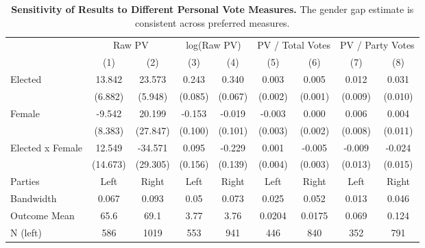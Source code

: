 \begin{table}[!h]

\caption{\label{tab:norway_pv_check} \textbf{Sensitivity of Results to Different Personal Vote Measures.} The gender gap estimate is consistent across preferred measures.}
\centering
\fontsize{9}{11}\selectfont
\begin{threeparttable}
\begin{tabular}[t]{lcccccccc}
\toprule
\multicolumn{1}{c}{ } & \multicolumn{2}{c}{Raw PV} & \multicolumn{2}{c}{log(Raw PV)} & \multicolumn{2}{c}{PV / Total Votes} & \multicolumn{2}{c}{PV / Party Votes} \\
\cmidrule(l{3pt}r{3pt}){2-3} \cmidrule(l{3pt}r{3pt}){4-5} \cmidrule(l{3pt}r{3pt}){6-7} \cmidrule(l{3pt}r{3pt}){8-9}
  & \multicolumn{1}{c}{(1)} & \multicolumn{1}{c}{(2)} & \multicolumn{1}{c}{(3)} & \multicolumn{1}{c}{(4)} & \multicolumn{1}{c}{(5)} & \multicolumn{1}{c}{(6)} & \multicolumn{1}{c}{(7)} & \multicolumn{1}{c}{(8)}\\
\midrule
Elected & 13.842 & 23.573 & 0.243 & 0.340 & 0.003 & 0.005 & 0.012 & 0.031\\
 & (6.882) & (5.948) & (0.085) & (0.067) & (0.002) & (0.001) & (0.009) & (0.010)\\
\addlinespace
Female & -9.542 & 20.199 & -0.153 & -0.019 & -0.003 & 0.000 & 0.006 & 0.004\\
 & (8.383) & (27.847) & (0.100) & (0.101) & (0.003) & (0.002) & (0.008) & (0.011)\\
\addlinespace
Elected x Female & 12.549 & -34.571 & 0.095 & -0.229 & 0.001 & -0.005 & -0.009 & -0.024\\
 & (14.673) & (29.305) & (0.156) & (0.139) & (0.004) & (0.003) & (0.013) & (0.015)\\
\addlinespace \midrule \addlinespace
\addlinespace
Parties & \multicolumn{1}{c}{Left} & \multicolumn{1}{c}{Right} & \multicolumn{1}{c}{Left} & \multicolumn{1}{c}{Right} & \multicolumn{1}{c}{Left} & \multicolumn{1}{c}{Right} & \multicolumn{1}{c}{Left} & \multicolumn{1}{c}{Right}\\
Bandwidth & 0.067 & 0.093 & 0.05 & 0.073 & 0.025 & 0.052 & 0.013 & 0.046\\
Outcome Mean & 65.6 & 69.1 & 3.77 & 3.76 & 0.0204 & 0.0175 & 0.069 & 0.124\\
N (left) & \multicolumn{1}{c}{586} & \multicolumn{1}{c}{1019} & \multicolumn{1}{c}{553} & \multicolumn{1}{c}{941} & \multicolumn{1}{c}{446} & \multicolumn{1}{c}{840} & \multicolumn{1}{c}{352} & \multicolumn{1}{c}{791}\\

\end{tabular}
\end{threeparttable}
\end{table}
